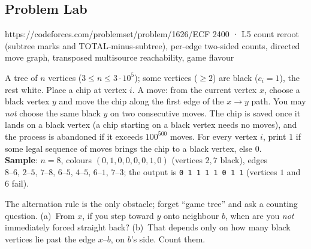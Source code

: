 \subsection{Problem Lab}

  {https://codeforces.com/problemset/problem/1626/E}{CF 2400 · L5}
  {count reroot (subtree marks and TOTAL-minus-subtree), per-edge two-sided
   counts, directed move graph, transposed multisource reachability, game flavour}

\begin{problemstatement}
A tree of $n$ vertices ($3 \le n \le 3\cdot10^{5}$); some vertices ($\ge 2$) are
black ($c_i=1$), the rest white. Place a chip at vertex $i$. A move: from the
current vertex $x$, choose a black vertex $y$ and move the chip along the first
edge of the $x\!\to\!y$ path. You may \emph{not} choose the same black $y$ on two
consecutive moves. The chip is saved once it lands on a black vertex (a chip
starting on a black vertex needs no moves), and the process is abandoned if it
exceeds $100^{500}$ moves. For every vertex $i$, print $1$ if some legal sequence
of moves brings the chip to a black vertex, else $0$.\\
\textbf{Sample}: $n=8$, colours $(0,1,0,0,0,0,1,0)$ (vertices $2,7$ black), edges
$8\text{--}6,\,2\text{--}5,\,7\text{--}8,\,6\text{--}5,\,4\text{--}5,\,6\text{--}1,\,
7\text{--}3$; the output is \texttt{0 1 1 1 1 0 1 1} (vertices $1$ and $6$ fail).
\end{problemstatement}

\begin{attemptgate}
The alternation rule is the only obstacle; forget ``game tree'' and ask a counting
question. (a)~From $x$, if you step toward $y$ onto neighbour $b$, when are you
\emph{not} immediately forced straight back? (b)~That depends only on how many
black vertices lie past the edge $x\text{--}b$, on $b$'s side. Count them.
\end{attemptgate}

